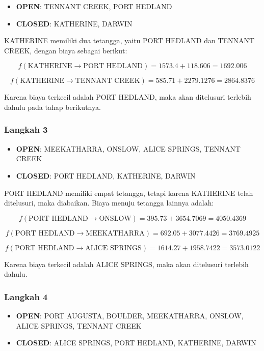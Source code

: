 \documentclass[12pt,a4paper]{article}
\begin{document}
\begin{itemize}
    \item \textbf{OPEN}: TENNANT CREEK, PORT HEDLAND
    \item \textbf{CLOSED}: KATHERINE, DARWIN
\end{itemize}

KATHERINE memiliki dua tetangga, yaitu PORT HEDLAND dan TENNANT CREEK, dengan biaya sebagai berikut:

\[
f(\text{KATHERINE} \to \text{PORT HEDLAND}) = 1573.4 + 118.606 = 1692.006
\]

\[
f(\text{KATHERINE} \to \text{TENNANT CREEK}) = 585.71 + 2279.1276 = 2864.8376
\]

Karena biaya terkecil adalah PORT HEDLAND, maka akan ditelusuri terlebih dahulu pada tahap berikutnya.  

\subsubsection*{Langkah 3}

\begin{itemize}
    \item \textbf{OPEN}: MEEKATHARRA, ONSLOW, ALICE SPRINGS, TENNANT CREEK
    \item \textbf{CLOSED}: PORT HEDLAND, KATHERINE, DARWIN
\end{itemize}

PORT HEDLAND memiliki empat tetangga, tetapi karena KATHERINE telah ditelusuri, maka diabaikan.  
Biaya menuju tetangga lainnya adalah:

\[
f(\text{PORT HEDLAND} \to \text{ONSLOW}) = 395.73 + 3654.7069 = 4050.4369
\]

\[
f(\text{PORT HEDLAND} \to \text{MEEKATHARRA}) = 692.05 + 3077.4426 = 3769.4925
\]

\[
f(\text{PORT HEDLAND} \to \text{ALICE SPRINGS}) = 1614.27 + 1958.7422 = 3573.0122
\]

Karena biaya terkecil adalah ALICE SPRINGS, maka akan ditelusuri terlebih dahulu.  

\subsubsection*{Langkah 4}

\begin{itemize}
    \item \textbf{OPEN}: PORT AUGUSTA, BOULDER, MEEKATHARRA, ONSLOW, ALICE SPRINGS, TENNANT CREEK
    \item \textbf{CLOSED}: ALICE SPRINGS, PORT HEDLAND, KATHERINE, DARWIN
\end{itemize}
\end{document}
